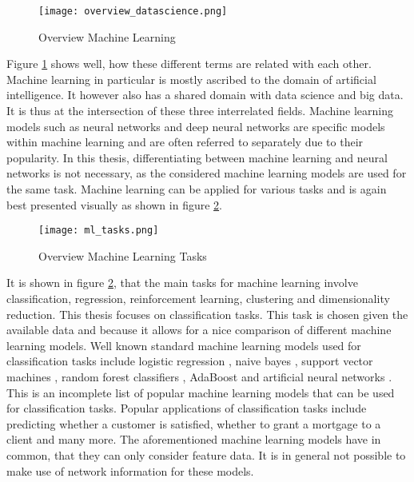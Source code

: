 	\begin{figure}[h]
		\centering
		\texttt{[image: overview\_datascience.png]}
		\caption{Overview Machine Learning}
		\citep{Frauenhofer2021}
		\label{fig:ml_overview}
	\end{figure} 

	\noindent Figure \ref{fig:ml_overview} shows well, how these different
	terms are related with each other. Machine learning in particular is
	mostly ascribed to the domain of artificial intelligence. It however also 
	has a shared domain with data science and big data. It is thus at the
	intersection of these three interrelated fields. Machine learning models 
	such as neural networks and deep neural networks are specific models within
	machine learning and are often referred to separately due to their
	popularity. In this thesis, differentiating between machine learning and
	neural networks is not necessary, as the considered machine learning models
	are used for the same task. Machine learning can be applied for various
	tasks and is again best presented visually as shown in figure 
	\ref{fig:ml_tasks}.

	\begin{figure}[h]
		\centering
		\texttt{[image: ml\_tasks.png]}
		\caption{Overview Machine Learning Tasks}
		\citep{Artisan2020}
		\label{fig:ml_tasks}
	\end{figure} 

	\noindent It is shown in figure \ref{fig:ml_tasks}, that the main tasks for
	machine learning involve classification, regression, reinforcement
	learning, clustering and dimensionality reduction. This thesis focuses on 
	classification tasks. This task is chosen given the available data and 
	because it allows for a nice comparison of different machine learning models. 
	Well known standard machine learning models used for classification tasks 
	include logistic regression \citep{cramer2002origins}, naive bayes 
	\citep{zhang2004bayes}, support vector machines 
	\citep{platt1999probabilistic}, random forest classifiers
	\citep{breiman2001random}, AdaBoost \citep{freund1997decision} and
	artificial neural networks \citep{mcculloch1943logical}. This is an
	incomplete list of popular machine learning models that can be used for
	classification tasks. Popular applications of classification tasks include 
	predicting whether a customer is satisfied, whether to grant a mortgage 
	to a client and many more. The aforementioned machine learning models
	have in common, that they can only consider feature data. It is in
	general not possible to make use of network information for these models. \\

